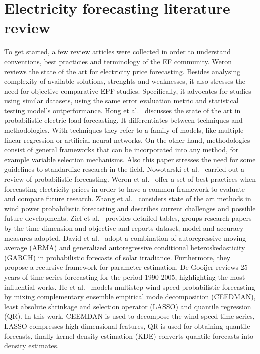 \section{Electricity forecasting literature review}
To get started, a few review articles were collected in order to understand conventions, best practicies and terminology of the EF community.
Weron \cite{EPF_review} reviews the state of the art for electricity price forecasting. Besides analysing complexity of available solutions, strenghts and weaknesses, it also stresses the need for objective comparative EPF studies. Specifically, it advocates for studies using similar datasets, using the same error evaluation metric and statistical testing model's outperformance.
Hong et al.\ \cite{prob_elf} discusses the state of the art in probabilistic electric load forecasting. It differentiates between techniques and methodologies. With techniques they refer to a family of models, like multiple linear regression or artificial neural networks. On the other hand, methodologies consist of general frameworks that can be incorporated into any method, for example variable selection mechanisms. Also this paper stresses the need for some guidelines to standardize research in the field.
Nowotarski et al.\ \cite{nowotarski} carried out a review of probabilistic forecasting.
Weron et al.\ \cite{lago} offer a set of best practices when forecasting electricity prices in order to have a common framework to evaluate and compare future research.
Zhang et al.\ \cite{zhang2014review} considers state of the art methods in wind power probabilistic forecasting and describes current challenges and possible future developments.
Ziel et al.\ \cite{ziel2018probabilistic} provides detailed tables, groups research papers by the time dimension and objective and reports dataset, model and accuracy 
measures adopted.
David et al.\ \cite{david2016probabilistic} adopt a combination of autoregressive moving average (ARMA) and generalized autoregressive conditional heteroskedasticity (GARCH) in probabilistic forecasts of solar irradiance. Furthermore, they propose a recursive framework for parameter estimation.
De Gooijer \cite{de200625} reviews 25 years of time series forecasting for the period 1990-2005, highlighting the most influential works.
He et al.\ \cite{he2022cooperative} models multistep wind speed probabilistic forecasting by mixing complementary ensemble empirical mode decomposition (CEEDMAN), least absolute shrinkage and selection operator (LASSO) and quantile regression (QR). In this work, CEEMDAN is used to decompose the wind speed time series, LASSO compresses high dimensional features, QR is used for obtaining quantile forecasts, finally kernel density estimation (KDE) converts quantile forecasts into density estimates.
